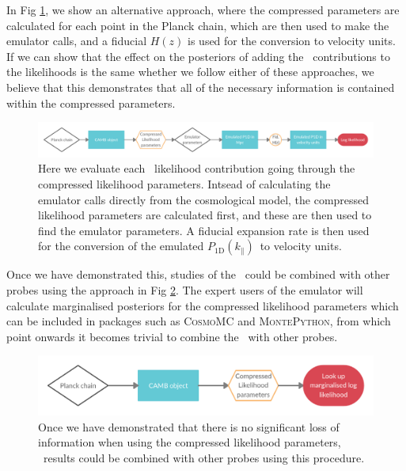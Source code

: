 \documentclass[preprintnumbers,prd,superscriptaddress,notitlepage,nofootinbib] {revtex4-1}
\newcommand{\fluxpower}{$P_\mathrm{1D}(k_\parallel)$}
\begin{document}
In Fig \ref{fig:param_map2}, we show an alternative approach, where the compressed
parameters are calculated for each point in the Planck chain, which are then used
to make the emulator calls, and a fiducial $H(z)$ is used for the conversion to
velocity units. If we can show that the effect on the posteriors of adding the \lyaf\
contributions to the likelihoods is the same whether we follow either of these
approaches, we believe that this demonstrates that all of the necessary information
is contained within the compressed parameters.

\begin{figure}[ht]
    \begin{center}
     \includegraphics[scale=0.2]{Figures/Compressed_test.png}
    \end{center}
    \caption{Here we evaluate each \lyaf\ likelihood contribution going
    through the compressed likelihood parameters. Intsead of calculating
    the emulator calls directly from the cosmological model, the compressed
    likelihood parameters are calculated first, and these are then used to
    find the emulator parameters. A fiducial expansion rate is then used for
    the conversion of the emulated \fluxpower\ to velocity units.}
    \label{fig:param_map2}
\end{figure}

Once we have demonstrated this, studies of the \lyaf\ could be combined with other
probes using the approach in Fig \ref{fig:param_map3}. The expert users of the emulator
will calculate marginalised posteriors for the compressed likelihood parameters which
can be included in packages such as \textsc{CosmoMC} and \textsc{MontePython}, from
which point onwards it becomes trivial to combine the \lyaf\ with other probes.

\begin{figure}[ht]
    \begin{center}
     \includegraphics[scale=0.2]{Figures/Marginalised_compressed.png}
    \end{center}
    \caption{Once we have demonstrated that there is no significant loss of
    information when using the compressed likelihood parameters, \lyaf\ results
    could be combined with other probes using this procedure.}
    \label{fig:param_map3}
\end{figure}
\end{document}
